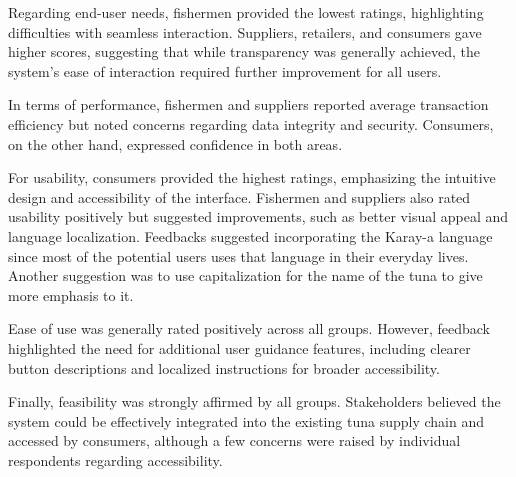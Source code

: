 \noindent Regarding end-user needs, fishermen provided the lowest ratings, highlighting difficulties with seamless interaction. Suppliers, retailers, and consumers gave higher scores, suggesting that while transparency was generally achieved, the system's ease of interaction required further improvement for all users.

\noindent In terms of performance, fishermen and suppliers reported average transaction efficiency but noted concerns regarding data integrity and security. Consumers, on the other hand, expressed confidence in both areas.

\noindent For  usability, consumers provided the highest ratings, emphasizing the intuitive design and accessibility of the interface. Fishermen and suppliers also rated usability positively but suggested improvements, such as better visual appeal and language localization. Feedbacks suggested incorporating the Karay-a language since most of the potential users uses that language in their everyday lives. Another suggestion was to use capitalization for the name of the tuna to give more emphasis to it.  

\noindent Ease of use was generally rated positively across all groups. However, feedback highlighted the need for additional user guidance features, including clearer button descriptions and localized instructions for broader accessibility.

\noindent Finally, feasibility was strongly affirmed by all groups. Stakeholders believed the system could be effectively integrated into the existing tuna supply chain and accessed by consumers, although a few concerns were raised by individual respondents regarding accessibility.
	


